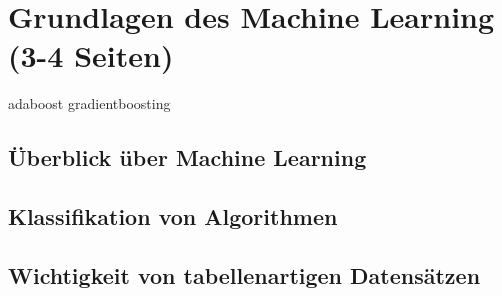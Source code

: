 \section{Grundlagen des Machine Learning (3-4 Seiten)}
\gls{adaboost}
\gls{gradientboosting}
\subsection{Überblick über Machine Learning}
\subsection{Klassifikation von Algorithmen}
\subsection{Wichtigkeit von tabellenartigen Datensätzen}